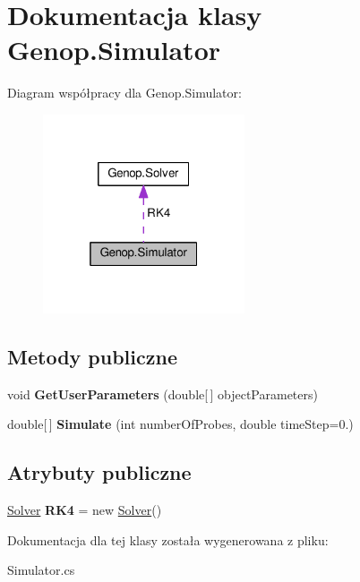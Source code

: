 \hypertarget{classGenop_1_1Simulator}{}\section{Dokumentacja klasy Genop.\+Simulator}
\label{classGenop_1_1Simulator}


Diagram współpracy dla Genop.\+Simulator\+:
\nopagebreak
\begin{figure}[H]
\begin{center}
\leavevmode
\includegraphics[width=169pt]{de/dcf/classGenop_1_1Simulator__coll__graph}
\end{center}
\end{figure}
\subsection*{Metody publiczne}
\begin{DoxyCompactItemize}
\item 
void {\bfseries Get\+User\+Parameters} (double\mbox{[}$\,$\mbox{]} object\+Parameters)\hypertarget{classGenop_1_1Simulator_a4bed492f372adb3bfb577a5caf7a143a}{}\label{classGenop_1_1Simulator_a4bed492f372adb3bfb577a5caf7a143a}

\item 
double\mbox{[}$\,$\mbox{]} {\bfseries Simulate} (int number\+Of\+Probes, double time\+Step=0.)\hypertarget{classGenop_1_1Simulator_ac3228946a174bafc232038ee2f74141c}{}\label{classGenop_1_1Simulator_ac3228946a174bafc232038ee2f74141c}

\end{DoxyCompactItemize}
\subsection*{Atrybuty publiczne}
\begin{DoxyCompactItemize}
\item 
\hyperlink{classGenop_1_1Solver}{Solver} {\bfseries R\+K4} = new \hyperlink{classGenop_1_1Solver}{Solver}()\hypertarget{classGenop_1_1Simulator_af3757fb33e92dbf3a883156d7289d6ec}{}\label{classGenop_1_1Simulator_af3757fb33e92dbf3a883156d7289d6ec}

\end{DoxyCompactItemize}


Dokumentacja dla tej klasy została wygenerowana z pliku\+:\begin{DoxyCompactItemize}
\item 
Simulator.\+cs\end{DoxyCompactItemize}
